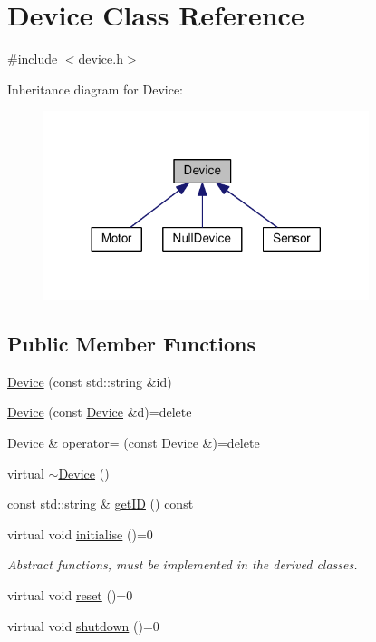 \hypertarget{class_device}{}\section{Device Class Reference}
\label{class_device}


{\ttfamily \#include $<$device.\+h$>$}



Inheritance diagram for Device\+:\nopagebreak
\begin{figure}[H]
\begin{center}
\leavevmode
\includegraphics[width=269pt]{class_device__inherit__graph}
\end{center}
\end{figure}
\subsection*{Public Member Functions}
\begin{DoxyCompactItemize}
\item 
\hyperlink{class_device_a831fcd5aa1de172a75977ef04bbca56a}{Device} (const std\+::string \&id)
\item 
\hyperlink{class_device_ac396693bdad11f7cd4209da76fe651f3}{Device} (const \hyperlink{class_device}{Device} \&d)=delete
\item 
\hyperlink{class_device}{Device} \& \hyperlink{class_device_a25d835db7132fe7f8fd33ace1e19a780}{operator=} (const \hyperlink{class_device}{Device} \&)=delete
\item 
virtual \hyperlink{class_device_af5f3f693be6b0dbde83d03bf7a336d2c}{$\sim$\+Device} ()
\item 
const std\+::string \& \hyperlink{class_device_a682e72b3243a703e7b6080f5f1c9553b}{get\+ID} () const 
\item 
virtual void \hyperlink{class_device_a66d75dab26ca84259877ca3fe5f2c2bd}{initialise} ()=0
\begin{DoxyCompactList}\small\item\em Abstract functions, must be implemented in the derived classes. \end{DoxyCompactList}\item 
virtual void \hyperlink{class_device_a6e43162e890cb40eafb923b0c94d167a}{reset} ()=0
\item 
virtual void \hyperlink{class_device_aab20e3f9dc696c6a1153776d526dcc0b}{shutdown} ()=0
\end{DoxyCompactItemize}


